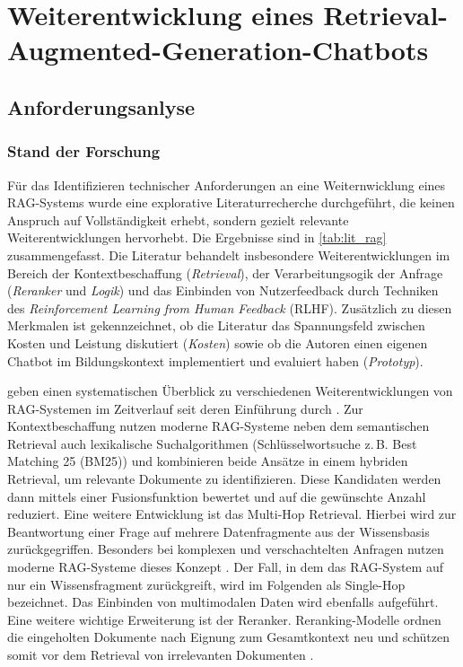 \section{Weiterentwicklung eines Retrieval-Augmented-Generation-Chatbots}

\subsection{Anforderungsanlyse}

\subsubsection{Stand der Forschung}
Für das Identifizieren technischer Anforderungen an eine Weiternwicklung eines RAG-Systems wurde eine explorative Literaturrecherche durchgeführt, die keinen Anspruch auf Vollständigkeit erhebt, sondern gezielt relevante Weiterentwicklungen hervorhebt. Die Ergebnisse sind in \autoref{tab:lit_rag} zusammengefasst. Die Literatur behandelt insbesondere Weiterentwicklungen im Bereich der Kontextbeschaffung (\textit{Retrieval}), der Verarbeitungsogik der Anfrage (\textit{Reranker} und \textit{Logik}) und das Einbinden von Nutzerfeedback durch Techniken des \textit{Reinforcement Learning from Human Feedback} (RLHF). Zusätzlich zu diesen Merkmalen ist gekennzeichnet, ob die Literatur das Spannungsfeld zwischen Kosten und Leistung diskutiert (\textit{Kosten}) sowie ob die Autoren einen eigenen Chatbot im Bildungskontext implementiert und evaluiert haben (\textit{Prototyp}).

 geben einen systematischen Überblick zu verschiedenen Weiterentwicklungen von RAG-Systemen im Zeitverlauf seit deren Einführung durch . Zur Kontextbeschaffung nutzen moderne RAG-Systeme neben dem semantischen Retrieval auch lexikalische Suchalgorithmen (Schlüsselwortsuche z.\,B. Best Matching 25 (BM25)) und kombinieren beide Ansätze in einem hybriden Retrieval, um relevante Dokumente zu identifizieren. Diese Kandidaten werden dann mittels einer Fusionsfunktion bewertet und auf die gewünschte Anzahl reduziert. Eine weitere Entwicklung ist das Multi-Hop Retrieval. Hierbei wird zur Beantwortung einer Frage auf mehrere Datenfragmente aus der Wissensbasis zurückgegriffen. Besonders bei komplexen und verschachtelten Anfragen nutzen moderne RAG-Systeme dieses Konzept \cite{RAGDevelopment2}. Der Fall, in dem das RAG-System auf nur ein Wissensfragment zurückgreift, wird im Folgenden als Single-Hop bezeichnet. Das Einbinden von multimodalen Daten wird ebenfalls aufgeführt. Eine weitere wichtige Erweiterung ist der Reranker. Reranking-Modelle ordnen die eingeholten Dokumente nach Eignung zum Gesamtkontext neu und schützen somit vor dem Retrieval von irrelevanten Dokumenten \cite{RAGDevelopment2}.

